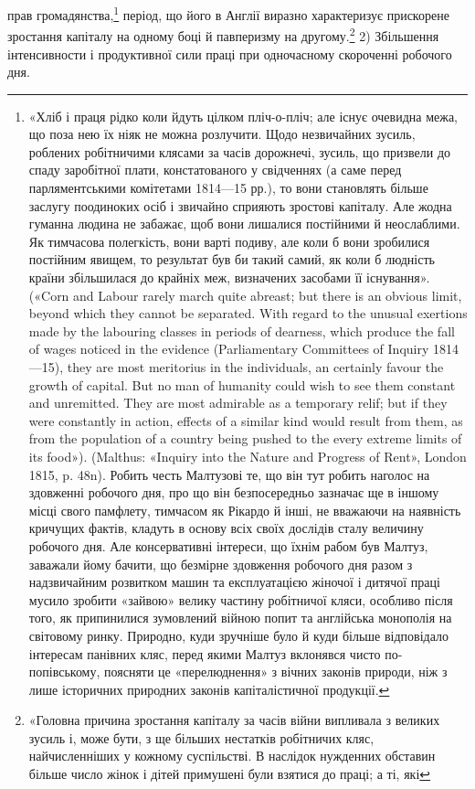 прав громадянства,\footnote{
«Хліб і праця рідко коли йдуть цілком пліч-о-пліч; але існує
очевидна межа, що поза нею їх ніяк не можна розлучити. Щодо незвичайних
зусиль, роблених робітничими клясами за часів дорожнечі, зусиль,
що призвели до спаду заробітної плати, констатованого у свідченнях
(а саме перед парляментськими комітетами 1814—15 рр.), то вони
становлять більше заслугу поодиноких осіб і звичайно сприяють зростові
капіталу. Але жодна гуманна людина не забажає, щоб вони лишалися
постійними й неослаблими. Як тимчасова полегкість, вони варті
подиву, але коли б вони зробилися постійним явищем, то результат був
би такий самий, як коли б людність країни збільшилася до крайніх меж,
визначених засобами її існування». («Corn and Labour rarely march
quite abreast; but there is an obvious limit, beyond which they cannot
be separated. With regard to the unusual exertions made by the labouring
classes in periods of dearness, which produce the fall of wages noticed in
the evidence (Parliamentary Committees of Inquiry 1814—15), they are
most meritorius in the individuals, an certainly favour the growth of capital.
But no man of humanity could wish to see them constant and unremitted.
They are most admirable as a temporary relif; but if they were
constantly in action, effects of a similar kind would result from them, as
from the population of a country being pushed to the every extreme limits
of its food»). (Malthus: «Inquiry into the Nature and Progress of Rent»,
London 1815, p. 48n). Робить честь Малтузові те, що він тут робить
наголос на здовженні робочого дня, про що він безпосередньо зазначає
ще в іншому місці свого памфлету, тимчасом як Рікардо й інші, не вважаючи
на наявність кричущих фактів, кладуть в основу всіх своїх дослідів
сталу величину робочого дня. Але консервативні інтереси, що їхнім
рабом був Малтуз, заважали йому бачити, що безмірне здовження робочого
дня разом з надзвичайним розвитком машин та експлуатацією жіночої
і дитячої праці мусило зробити «зайвою» велику частину робітничої
кляси, особливо після того, як припинилися зумовлений війною попит
та англійська монополія на світовому ринку. Природно, куди зручніше
було й куди більше відповідало інтересам панівних кляс, перед якими
Малтуз вклонявся чисто по-попівському, поясняти це «перелюднення»
з вічних законів природи, ніж з лише історичних природних законів
капіталістичної продукції.
} період, що його в Англії виразно характеризує
прискорене зростання капіталу на одному боці й павперизму
на другому.\footnote{
«Головна причина зростання капіталу за часів війни випливала
з великих зусиль і, може бути, з ще більших нестатків робітничих кляс,
найчисленніших у кожному суспільстві. В наслідок нужденних обставин
більше число жінок і дітей примушені були взятися до праці; а ті, які
}
2) Збільшення інтенсивности і продуктивної сили праці при
одночасному скороченні робочого дня.

